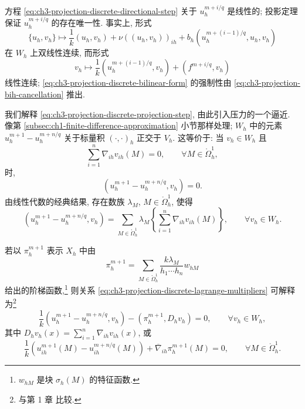 方程 \eqref{eq:ch3-projection-discrete-directional-step} 关于 $u_h^{m+i/q}$ 是线性的; 投影定理  保证 $u_h^{m+i/q}$ 的存在唯一性. 事实上, 形式
\begin{equation}
\{u_h,v_h\}\longmapsto
\frac1k(u_h,v_h)+\nu((u_h,v_h))_{ih}
+b_h(u_h^{m+(i-1)/q},u_h,v_h)
\label{eq:ch3-projection-discrete-bilinear-form}
\end{equation}
在 $W_h$ 上双线性连续, 而形式
\[
v_h\longmapsto\frac1k(u_h^{m+(i-1)/q},v_h)
+(f^{m+i/q},v_h)
\]
线性连续; \eqref{eq:ch3-projection-discrete-bilinear-form} 的强制性由 \eqref{eq:ch3-projection-bih-cancellation} 推出.

\begin{Remark}
\label{rem:ch3-projection-discrete-pressure}
我们解释 \eqref{eq:ch3-projection-discrete-projection-step}, 由此引入压力的一个逼近. 像第 \ref{subsec:ch1-finite-difference-approximation} 小节那样处理; $W_h$ 中的元素 $u_h^{m+1}-u_h^{m+n/q}$ 关于标量积 $(\cdot,\cdot)_h$ 正交于 $V_h$. 这等价于: 当 $v_h\in W_h$ 且
\begin{equation}
\sum_{i=1}^n\nabla_{ih}v_{ih}(M)=0,
\qquad\forall M\in\mathring\Omega_h^1,
\label{eq:ch3-projection-discrete-divergence-condition}
\end{equation}
时,
\[
(u_h^{m+1}-u_h^{m+n/q},v_h)=0.
\]
由线性代数的经典结果, 存在数族 $\lambda_M$, $M\in\mathring\Omega_h^1$, 使得
\begin{equation}
(u_h^{m+1}-u_h^{m+n/q},v_h)
=\sum_{M\in\mathring\Omega_h^1}\lambda_M
\left\{\sum_{i=1}^n\nabla_{ih}v_{ih}(M)\right\},
\qquad\forall v_h\in W_h.
\label{eq:ch3-projection-discrete-lagrange-multipliers}
\end{equation}
\end{Remark}

\hypertarget{chapter-03-page-294}{}
若以 $\pi_h^{m+1}$ 表示 $X_h$ 中由
\begin{equation}
\pi_h^{m+1}
=\sum_{M\in\mathring\Omega_h^1}
\frac{k\lambda_M}{h_1\cdots h_n}w_{hM}
\label{eq:ch3-projection-discrete-pressure-definition}
\end{equation}
给出的阶梯函数,\footnote{$w_{hM}$ 是块 $\sigma_h(M)$ 的特征函数.} 则关系 \eqref{eq:ch3-projection-discrete-lagrange-multipliers} 可解释为\footnote{与第 1 章  比较.}
\begin{equation}
\frac1k(u_h^{m+1}-u_h^{m+n/q},v_h)
-(\pi_h^{m+1},D_hv_h)=0,
\qquad\forall v_h\in W_h,
\label{eq:ch3-projection-discrete-pressure-weak}
\end{equation}
其中 $D_hv_h(x)=\sum_{i=1}^n\nabla_{ih}v_{ih}(x)$, 或
\begin{equation}
\frac1k(u_{ih}^{m+1}(M)-u_{ih}^{m+n/q}(M))
+\overline\nabla_{ih}\pi_h^{m+1}(M)=0,
\qquad\forall M\in\mathring\Omega_h^1.
\label{eq:ch3-projection-discrete-pressure-pointwise}
\end{equation}

